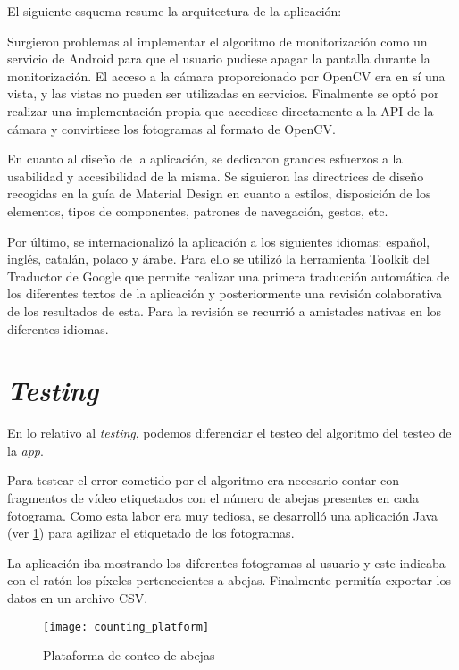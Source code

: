 El siguiente esquema resume la arquitectura de la aplicación:


Surgieron problemas al implementar el algoritmo de monitorización como
un servicio de Android para que el usuario pudiese apagar la pantalla
durante la monitorización. El acceso a la cámara proporcionado por
OpenCV era en sí una vista, y las vistas no pueden ser utilizadas en
servicios. Finalmente se optó por realizar una implementación propia que
accediese directamente a la API de la cámara y convirtiese los
fotogramas al formato de OpenCV.

En cuanto al diseño de la aplicación, se dedicaron grandes esfuerzos a
la usabilidad y accesibilidad de la misma. Se siguieron las directrices
de diseño recogidas en la guía de Material Design en cuanto a estilos,
disposición de los elementos, tipos de componentes, patrones de
navegación, gestos, etc.

Por último, se internacionalizó la aplicación a los siguientes idiomas:
español, inglés, catalán, polaco y árabe. Para ello se utilizó la
herramienta Toolkit del Traductor de Google que permite realizar una
primera traducción automática de los diferentes textos de la aplicación
y posteriormente una revisión colaborativa de los resultados de esta.
Para la revisión se recurrió a amistades nativas en los diferentes
idiomas.

\section{\emph{Testing}}\label{testing}

En lo relativo al \emph{testing}, podemos diferenciar el testeo del
algoritmo del testeo de la \emph{app}.

Para testear el error cometido por el algoritmo era necesario contar con
fragmentos de vídeo etiquetados con el número de abejas presentes en
cada fotograma. Como esta labor era muy tediosa, se desarrolló una
aplicación Java (ver \ref{fig:counting_platform}) para agilizar 
el etiquetado de los fotogramas.

La aplicación iba mostrando los diferentes fotogramas al usuario y este
indicaba con el ratón los píxeles pertenecientes a abejas. Finalmente
permitía exportar los datos en un archivo CSV.

\begin{figure}[H]
	\centering
	\texttt{[image: counting\_platform]}
	\caption{Plataforma de conteo de abejas}\label{fig:counting_platform}
\end{figure}

